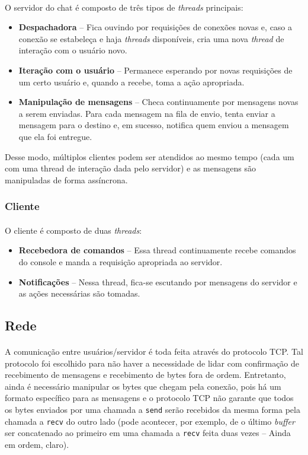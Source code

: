 \documentclass[11pt]{article}
\newcommand{\tit}[1]{\textit{#1}}
\newcommand{\tbf}[1]{\textbf{#1}}
\newcommand{\ttt}[1]{\texttt{#1}}
\begin{document}
\paragraph{}
O servidor do chat é composto de três tipos de \tit{threads} principais: 
\begin{itemize}
	\item \tbf{Despachadora} -- 
		Fica ouvindo por requisições de conexões novas
		e, caso a conexão se estabeleça e haja \tit{threads} disponíveis, 
		cria uma nova \tit{thread} de interação com o usuário novo.
	\item \tbf{Iteração com o usuário} -- 
		Permanece esperando por novas requisições de um certo usuário e,
		quando a recebe, toma a ação apropriada.
	\item \tbf{Manipulação de mensagens} --
		Checa continuamente por mensagens novas a serem enviadas. 
		Para cada mensagem na fila de envio, tenta enviar a mensagem para
		o destino e, em sucesso, notifica quem enviou a mensagem que ela
		foi entregue.
\end{itemize}
Desse modo, múltiplos clientes podem ser atendidos ao mesmo tempo (cada um com 
uma thread de interação dada pelo servidor) e as mensagens são manipuladas 
de forma assíncrona.

\subsubsection{Cliente}
\paragraph{}
O cliente é composto de duas \tit{threads}:
\begin{itemize}
	\item \tbf{Recebedora de comandos} --
		Essa thread continuamente recebe comandos do console e manda a 
		requisição apropriada ao servidor.
	\item \tbf{Notificações} --
		Nessa thread, fica-se escutando por mensagens do servidor e as ações
		necessárias são tomadas.
\end{itemize}

\subsection{Rede}
\paragraph{}
A comunicação entre usuários/servidor é toda feita através do protocolo TCP\@.
Tal protocolo foi escolhido para não haver a necessidade de lidar com
confirmação de recebimento de mensagens e recebimento de bytes fora de ordem.
Entretanto, ainda é necessário manipular os bytes que chegam pela conexão,
pois há um formato específico para as mensagens e o protocolo TCP não garante
que todos os bytes enviados por uma chamada a \ttt{send} serão recebidos 
da mesma forma pela chamada a \ttt{recv} do outro lado (pode acontecer, por
exemplo, de o último \tit{buffer} ser concatenado ao primeiro em uma chamada
a \ttt{recv} feita duas vezes -- Ainda em ordem, claro).
\end{document}
